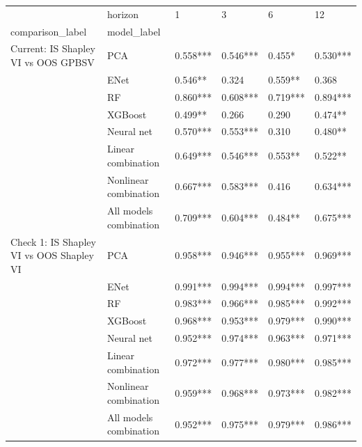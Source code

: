 \begin{tabular}{llllll}
\toprule
                                     & horizon &        1  &        3  &        6  &        12 \\
comparison\_label & model\_label &           &           &           &           \\
\midrule
Current: IS Shapley VI vs OOS GPBSV & PCA &  0.558*** &  0.546*** &    0.455* &  0.530*** \\
                                     & ENet &   0.546** &     0.324 &   0.559** &     0.368 \\
                                     & RF &  0.860*** &  0.608*** &  0.719*** &  0.894*** \\
                                     & XGBoost &   0.499** &     0.266 &     0.290 &   0.474** \\
                                     & Neural net &  0.570*** &  0.553*** &     0.310 &   0.480** \\
                                     & Linear combination &  0.649*** &  0.546*** &   0.553** &   0.522** \\
                                     & Nonlinear combination &  0.667*** &  0.583*** &     0.416 &  0.634*** \\
                                     & All models combination &  0.709*** &  0.604*** &   0.484** &  0.675*** \\
Check 1: IS Shapley VI vs OOS Shapley VI & PCA &  0.958*** &  0.946*** &  0.955*** &  0.969*** \\
                                     & ENet &  0.991*** &  0.994*** &  0.994*** &  0.997*** \\
                                     & RF &  0.983*** &  0.966*** &  0.985*** &  0.992*** \\
                                     & XGBoost &  0.968*** &  0.953*** &  0.979*** &  0.990*** \\
                                     & Neural net &  0.952*** &  0.974*** &  0.963*** &  0.971*** \\
                                     & Linear combination &  0.972*** &  0.977*** &  0.980*** &  0.985*** \\
                                     & Nonlinear combination &  0.959*** &  0.968*** &  0.973*** &  0.982*** \\
                                     & All models combination &  0.952*** &  0.975*** &  0.979*** &  0.986*** \\

\end{tabular}
